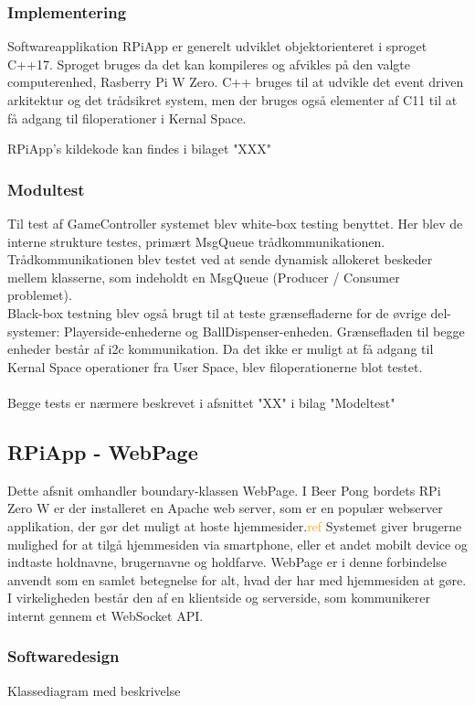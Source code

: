\documentclass[Rapport/Rapport_main.tex]{subfiles}
\begin{document}
\subsubsection{Implementering}
Softwareapplikation RPiApp er generelt udviklet objektorienteret i sproget C++17. Sproget bruges da det kan kompileres og afvikles på den valgte computerenhed, Rasberry Pi W Zero. C++ bruges til at udvikle det event driven arkitektur og det trådsikret system, men der bruges også elementer af C11 til at få adgang til filoperationer i Kernal Space.

RPiApp's kildekode kan findes i bilaget "XXX"

\subsubsection{Modultest}
Til test af GameController systemet blev white-box testing benyttet. Her blev de interne strukture testes, primært MsgQueue trådkommunikationen. Trådkommunikationen blev testet ved at sende dynamisk allokeret beskeder mellem klasserne, som indeholdt en MsgQueue (Producer / Consumer problemet). \\
Black-box testning blev også brugt til at teste grænsefladerne for de øvrige del-systemer: Playerside-enhederne og BallDispenser-enheden. Grænsefladen til begge enheder består af i2c kommunikation. Da det ikke er muligt at få adgang til Kernal Space operationer fra User Space, blev filoperationerne blot testet. \\\\
Begge tests er nærmere beskrevet i afsnittet "XX" i bilag "Modeltest"


\subsection{RPiApp - WebPage}
Dette afsnit omhandler boundary-klassen WebPage. I Beer Pong bordets RPi Zero W er der installeret en Apache web server, som er en populær webserver applikation, der gør det muligt at hoste hjemmesider.\textcolor{orange}{ref} Systemet giver brugerne mulighed for at tilgå hjemmesiden via smartphone, eller et andet mobilt device og indtaste holdnavne, brugernavne og holdfarve. WebPage er i denne forbindelse anvendt som en samlet betegnelse for alt, hvad der har med hjemmesiden at gøre. I virkeligheden består den af en klientside og serverside, som kommunikerer internt gennem et WebSocket API. 

\subsubsection{Softwaredesign}
Klassediagram med beskrivelse
\end{document}

